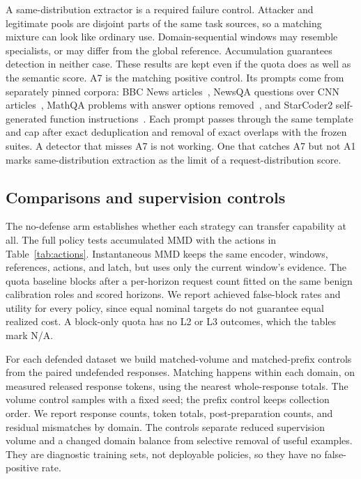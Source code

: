 \documentclass[journal]{IEEEtran}
\begin{document}
A same-distribution extractor is a required failure control. Attacker and legitimate pools are disjoint parts of the same task sources, so a matching mixture can look like ordinary use. Domain-sequential windows may resemble specialists, or may differ from the global reference. Accumulation guarantees detection in neither case. These results are kept even if the quota does as well as the semantic score. A7 is the matching positive control. Its prompts come from separately pinned corpora: BBC News articles~\cite{greene2006bbc}, NewsQA questions over CNN articles~\cite{trischler2017newsqa}, MathQA problems with answer options removed~\cite{amini2019mathqa}, and StarCoder2 self-generated function instructions~\cite{wei2024selfcodealign}. Each prompt passes through the same template and cap after exact deduplication and removal of exact overlaps with the frozen suites. A detector that misses A7 is not working. One that catches A7 but not A1 marks same-distribution extraction as the limit of a request-distribution score.

\subsection{Comparisons and supervision controls}
\label{sec:baselines}
The no-defense arm establishes whether each strategy can transfer capability at all. The full policy tests accumulated MMD with the actions in Table~\ref{tab:actions}. Instantaneous MMD keeps the same encoder, windows, references, actions, and latch, but uses only the current window's evidence. The quota baseline blocks after a per-horizon request count fitted on the same benign calibration roles and scored horizons. We report achieved false-block rates and utility for every policy, since equal nominal targets do not guarantee equal realized cost. A block-only quota has no L2 or L3 outcomes, which the tables mark N/A.

For each defended dataset we build matched-volume and matched-prefix controls from the paired undefended responses. Matching happens within each domain, on measured released response tokens, using the nearest whole-response totals. The volume control samples with a fixed seed; the prefix control keeps collection order. We report response counts, token totals, post-preparation counts, and residual mismatches by domain. The controls separate reduced supervision volume and a changed domain balance from selective removal of useful examples. They are diagnostic training sets, not deployable policies, so they have no false-positive rate.
\end{document}
